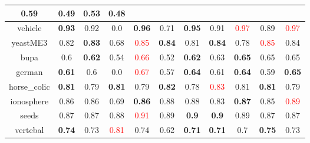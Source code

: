 \documentclass{article}%
\begin{document}
\begin{tabular}{c|cccccccccc}
{0.59
}&0.49&\textbf{0.53}&0.48\\%
\hline%
vehicle&\textbf{0.93}&0.92&0.0&\textbf{0.96}&0.71&\textbf{0.95}&0.91&\textcolor{red}{ 
0.97
}&0.89&\textcolor{red}{ 
0.97
}\\%
\hline%
yeastME3&0.82&\textbf{0.83}&0.68&\textcolor{red}{ 
0.85
}&\textbf{0.84}&0.81&\textbf{0.84}&0.78&\textcolor{red}{ 
0.85
}&0.84\\%
\hline%
bupa&0.6&\textbf{0.62}&0.54&\textcolor{red}{ 
0.66
}&0.52&\textbf{0.62}&0.63&\textbf{0.65}&0.65&0.65\\%
\hline%
german&\textbf{0.61}&0.6&0.0&\textcolor{red}{ 
0.67
}&0.57&\textbf{0.64}&0.61&\textbf{0.64}&0.59&\textbf{0.65}\\%
\hline%
horse\_colic&\textbf{0.81}&0.79&\textbf{0.81}&0.79&\textbf{0.82}&0.78&\textcolor{red}{ 
0.83
}&0.81&\textbf{0.81}&0.79\\%
\hline%
ionosphere&0.86&0.86&0.69&\textbf{0.86}&0.88&0.88&0.83&\textbf{0.87}&0.85&\textcolor{red}{ 
0.89
}\\%
\hline%
seeds&0.87&0.87&0.88&\textcolor{red}{ 
0.91
}&0.89&\textbf{0.9}&\textbf{0.9}&0.89&0.87&0.87\\%
\hline%
vertebal&\textbf{0.74}&0.73&\textcolor{red}{ 
0.81
}&0.74&0.62&\textbf{0.71}&\textbf{0.71}&0.7&\textbf{0.75}&0.73\\%
\hline%
\end{tabular}

%
\end{document}

